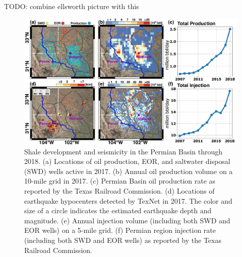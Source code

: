 
TODO: combine ellsworth picture with this

\begin{figure}[hbt!]
	\centering
	\includegraphics[width=0.99\linewidth]{paper1-permian/figures/supplement/figureS1-cisr-data.pdf}
	\caption[Shale development and seismicity in the Permian Basin.]{Shale development and seismicity in the Permian Basin through 2018. 
		(a) Locations of oil production, EOR, and saltwater disposal (SWD) wells active in 2017. (b) Annual oil production volume on a 10-mile grid in 2017. (c) Permian Basin oil production rate as reported by the Texas Railroad Commission. (d) Locations of earthquake hypocenters detected by TexNet in 2017. The color and size of a circle indicates the estimated earthquake depth and magnitude. (e) Annual injection volume (including both SWD and EOR wells) on a 5-mile grid. (f) Permian region injection rate (including both SWD and EOR wells) as reported by the Texas Railroad Commission.
	}
	\label{fig:permian-oil-6panel}
\end{figure}






%
%


